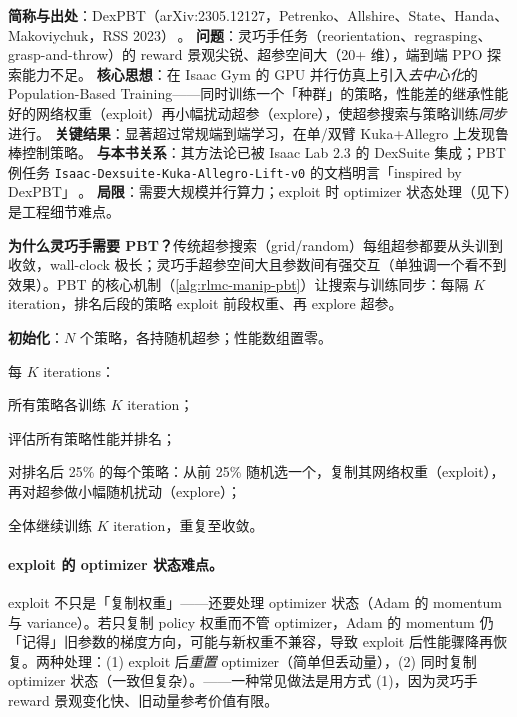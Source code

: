 \begin{paper}\label{paper:rlmc-manip-dexpbt}
\textbf{简称与出处}：DexPBT（arXiv:2305.12127，Petrenko、Allshire、State、Handa、Makoviychuk，RSS 2023）\,\cite{petrenko2023dexpbt}。
\textbf{问题}：灵巧手任务（reorientation、regrasping、grasp-and-throw）的 reward 景观尖锐、超参空间大（20+ 维），端到端 PPO 探索能力不足。
\textbf{核心思想}：在 Isaac Gym 的 GPU 并行仿真上引入\emph{去中心化}的 Population-Based Training——同时训练一个「种群」的策略，性能差的继承性能好的网络权重（exploit）再小幅扰动超参（explore），使超参搜索与策略训练\emph{同步}进行。
\textbf{关键结果}：显著超过常规端到端学习，在单/双臂 Kuka+Allegro 上发现鲁棒控制策略。
\textbf{与本书关系}：其方法论已被 Isaac Lab 2.3 的 DexSuite 集成；PBT 例任务 \verb|Isaac-Dexsuite-Kuka-Allegro-Lift-v0| 的文档明言「inspired by DexPBT」\,\cite{nvidia2025isaaclab23}。
\textbf{局限}：需要大规模并行算力；exploit 时 optimizer 状态处理（见下）是工程细节难点。
\end{paper}

\textbf{为什么灵巧手需要 PBT？}传统超参搜索（grid/random）每组超参都要从头训到收敛，wall-clock 极长；灵巧手超参空间大且参数间有强交互（单独调一个看不到效果）。PBT 的核心机制（\cref{alg:rlmc-manip-pbt}）让搜索与训练同步：每隔 $K$ iteration，排名后段的策略 exploit 前段权重、再 explore 超参。

\begin{algo}\label{alg:rlmc-manip-pbt}
\textbf{初始化}：$N$ 个策略，各持随机超参；性能数组置零。

每 $K$ iterations：

\quad 所有策略各训练 $K$ iteration；

\quad 评估所有策略性能并排名；

\quad 对排名后 25\% 的每个策略：从前 25\% 随机选一个，复制其网络权重（exploit），再对超参做小幅随机扰动（explore）；

\quad 全体继续训练 $K$ iteration，重复至收敛。
\end{algo}

\paragraph{exploit 的 optimizer 状态难点。}exploit 不只是「复制权重」——还要处理 optimizer 状态（Adam 的 momentum 与 variance）。若只复制 policy 权重而不管 optimizer，Adam 的 momentum 仍「记得」旧参数的梯度方向，可能与新权重不兼容，导致 exploit 后性能骤降再恢复。两种处理：(1) exploit 后\emph{重置} optimizer（简单但丢动量），(2) 同时复制 optimizer 状态（一致但复杂）。——一种常见做法是用方式 (1)，因为灵巧手 reward 景观变化快、旧动量参考价值有限。

